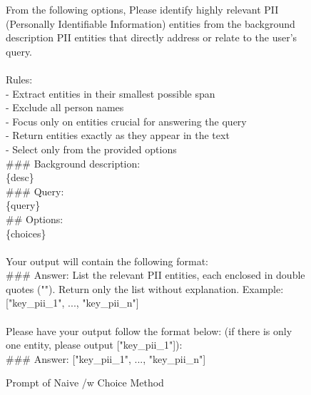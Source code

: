 \begin{figure*}[htbp]
\begin{tcolorbox}[colback=white, colframe=black, title=Choice-Based Query-related PII Detection Prompt]
From the following options, Please identify highly relevant PII (Personally Identifiable Information) entities from the background description PII entities that directly address or relate to the user's query.\\
\\
Rules:\\
- Extract entities in their smallest possible span\\
- Exclude all person names\\
- Focus only on entities crucial for answering the query\\
- Return entities exactly as they appear in the text\\
- Select only from the provided options\\

\#\#\# Background description:\\
\{desc\}\\
\#\#\# Query:\\
\{query\}\\
\#\# Options:\\
\{choices\}\\
\\
Your output will contain the following format:\\
\#\#\# Answer: List the relevant PII entities, each enclosed in double quotes (""). Return only the list without explanation. Example: ["key\_pii\_1", ..., "key\_pii\_n"]\\
\\
Please have your output follow the format below: (if there is only one entity, please output ["key\_pii\_1"]):\\
\#\#\# Answer: ["key\_pii\_1", ..., "key\_pii\_n"]
\end{tcolorbox}
\caption{Prompt of Naive /w Choice Method}
\label{fig:choice-prompt}
\end{figure*}

